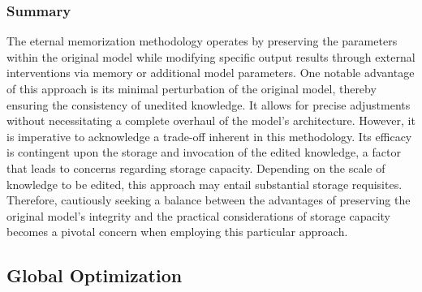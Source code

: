 \documentclass[acmsmall, screen]{acmart}
\begin{document}
\subsubsection{\textbf{Summary}} The eternal memorization methodology operates by preserving the parameters within the original model while modifying specific output results through external interventions via memory or additional model parameters. One notable advantage of this approach is its minimal perturbation of the original model, thereby ensuring the consistency of unedited knowledge. It allows for precise adjustments without necessitating a complete overhaul of the model's architecture. However, it is imperative to acknowledge a trade-off inherent in this methodology. Its efficacy is contingent upon the storage and invocation of the edited knowledge, a factor that leads to concerns regarding storage capacity. Depending on the scale of knowledge to be edited, this approach may entail substantial storage requisites. Therefore, cautiously seeking a balance between the advantages of preserving the original model's integrity and the practical considerations of storage capacity becomes a pivotal concern when employing this particular approach.





\subsection{Global Optimization}\label{sec:global}
\end{document}
